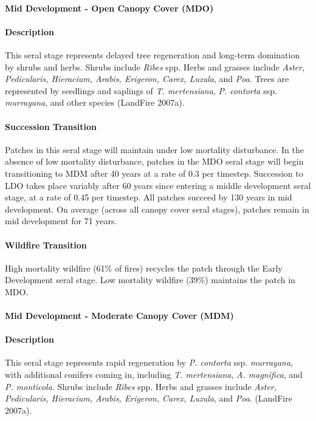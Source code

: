 \noindent\hrulefill


\paragraph{Mid Development - Open Canopy Cover (MDO)} 

\paragraph{Description} This seral stage represents delayed tree regeneration and long-term domination by shrubs and herbs. Shrubs include \emph{Ribes} spp. Herbs and grasses include \emph{Aster, Pedicularis, Hieracium, Arabis, Erigeron, Carex, Luzula}, and \emph{Poa}. Trees are represented by seedlings and saplings of \emph{T. mertensiana}, \emph{P. contorta} ssp. \emph{murrayana}, and other species (LandFire 2007a).

\paragraph{Succession Transition} Patches in this seral stage will maintain under low mortality disturbance. In the absence of low mortality disturbance, patches in the MDO seral stage will begin transitioning to MDM after 40 years at a rate of 0.3 per timestep. Succession to LDO takes place variably after 60 years since entering a middle development seral stage, at a rate of 0.45 per timestep. All patches succeed by 130 years in mid development.  On average (across all canopy cover seral stages), patches remain in mid development for 71 years.

\paragraph{Wildfire Transition} High mortality wildfire (61\% of fires) recycles the patch through the Early Development seral stage. Low mortality wildfire (39\%) maintains the patch in MDO.

\noindent\hrulefill

\paragraph{Mid Development - Moderate Canopy Cover (MDM)}

\paragraph{Description} This seral stage represents rapid regeneration by \emph{P. contorta} ssp. \emph{murrayana}, with additional conifers coming in, including \emph{T. mertensiana}, \emph{A. magnifica}, and \emph{P. monticola}. Shrubs include \emph{Ribes} spp. Herbs and grasses include \emph{Aster, Pedicularis, Hieracium, Arabis, Erigeron, Carex, Luzula}, and \emph{Poa}. (LandFire 2007a).

